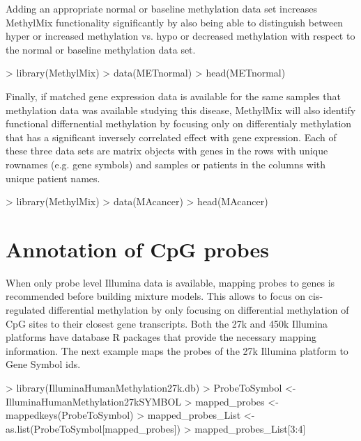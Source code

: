 \documentclass[11pt]{article}
\begin{document}
Adding an appropriate normal or baseline methylation data set increases 
MethylMix functionality significantly by also being able to distinguish 
between hyper or increased methylation vs. hypo or decreased methylation with 
respect to the normal or baseline methylation data set. 

\begin{Schunk}
\begin{Sinput}
> library(MethylMix)
> data(METnormal)
> head(METnormal)
\end{Sinput}
\end{Schunk}

Finally, if matched gene expression data is available for the same samples that 
methylation data was available studying this disease, MethylMix will also 
identify functional differnential methylation by focusing only on differentialy 
methylation that has a significant inversely correlated effect with gene 
expression. Each of these three data sets are matrix objects with genes in the 
rows with unique rownames (e.g. gene symbols) and samples or patients in the 
columns with unique patient names. 

\begin{Schunk}
\begin{Sinput}
> library(MethylMix)
> data(MAcancer)
> head(MAcancer)
\end{Sinput}
\end{Schunk}

\section{Annotation of CpG probes}\label{CpGanotation}
When only probe level Illumina data is available, mapping probes to genes is 
recommended before building mixture models. This allows to focus on cis-
regulated differential methylation by only focusing on differential methylation 
of CpG sites to their closest gene transcripts. Both the 27k and 450k Illumina 
platforms have database R packages that provide the necessary mapping 
information. The next example maps the probes of the 27k Illumina platform to 
Gene Symbol ids. 

\begin{Schunk}
\begin{Sinput}
> library(IlluminaHumanMethylation27k.db)
> ProbeToSymbol <- IlluminaHumanMethylation27kSYMBOL
> mapped_probes <- mappedkeys(ProbeToSymbol)
> mapped_probes_List <- as.list(ProbeToSymbol[mapped_probes])
> mapped_probes_List[3:4]
\end{Sinput}
\end{Schunk}
\end{document}
